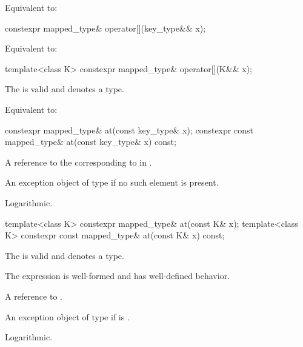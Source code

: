 \begin{itemdescr}
\pnum
\effects
Equivalent to: 
\end{itemdescr}

%
\begin{itemdecl}
constexpr mapped_type& operator[](key_type&& x);
\end{itemdecl}

\begin{itemdescr}
\pnum
\effects
Equivalent to: 
\end{itemdescr}

%
\begin{itemdecl}
template<class K> constexpr mapped_type& operator[](K&& x);
\end{itemdecl}

\begin{itemdescr}
\pnum
\constraints
The  
is valid and denotes a type.

\pnum
\effects
Equivalent to: 
\end{itemdescr}

%
\begin{itemdecl}
constexpr mapped_type&       at(const key_type& x);
constexpr const mapped_type& at(const key_type& x) const;
\end{itemdecl}

\begin{itemdescr}
\pnum
\returns
A reference to the  corresponding to  in .

\pnum
\throws
An exception object of type  if
no such element is present.

\pnum
\complexity
Logarithmic.
\end{itemdescr}

%
\begin{itemdecl}
template<class K> constexpr mapped_type&       at(const K& x);
template<class K> constexpr const mapped_type& at(const K& x) const;
\end{itemdecl}

\begin{itemdescr}
\pnum
\constraints
The  
is valid and denotes a type.

\pnum
\expects
The expression  is well-formed and has well-defined behavior.

\pnum
\returns
A reference to .

\pnum
\throws
An exception object of type  if
 is .

\pnum
\complexity
Logarithmic.
\end{itemdescr}

